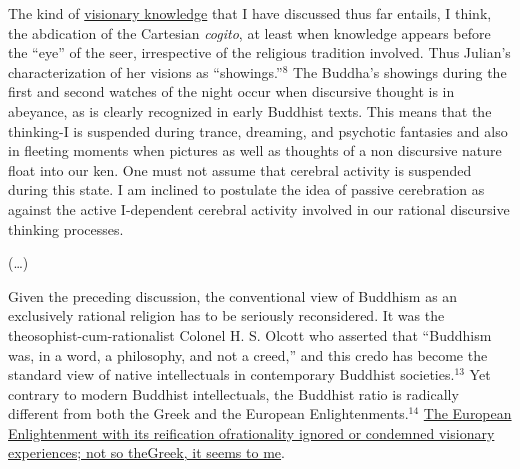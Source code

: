 \begin{myquote}
The kind of \underline{visionary knowledge} that I have discussed thus far entails, I think, the abdication of the Cartesian \textit{cogito}, at least when knowledge appears before the “eye” of the seer, irrespective of the religious tradition involved. Thus Julian’s characterization of her visions as “showings.”$^{8}$ The Buddha’s showings during the first and second watches of the night occur when discursive thought is in abeyance, as is clearly recognized in early Buddhist texts. This means that the thinking-I is suspended during trance, dreaming, and psychotic fantasies and also in ﬂeeting moments when pictures as well as thoughts of a non discursive nature ﬂoat into our ken. One must not assume that cerebral activity is suspended during this state. I am inclined to postulate the idea of passive cerebration as against the active I-dependent cerebral activity involved in our rational discursive thinking processes.
\end{myquote}

\begin{myquote}
(…)
\end{myquote}

\begin{myquote}
Given the preceding discussion, the conventional view of Buddhism as an exclusively rational religion has to be seriously reconsidered. It was the theosophist-cum-rationalist Colonel H. S. Olcott who asserted that “Buddhism was, in a word, a philosophy, and not a creed,” and this credo has become the standard view of native intellectuals in contemporary Buddhist societies.$^{13}$ Yet contrary to modern Buddhist intellectuals, the Buddhist ratio is radically different from both the Greek and the European Enlightenments.$^{14}$ \underline{The European Enlightenment with its reification of}\break \underline{rationality ignored or condemned visionary experiences; not so the}\break \underline{Greek, it seems to me}.
\end{myquote}

